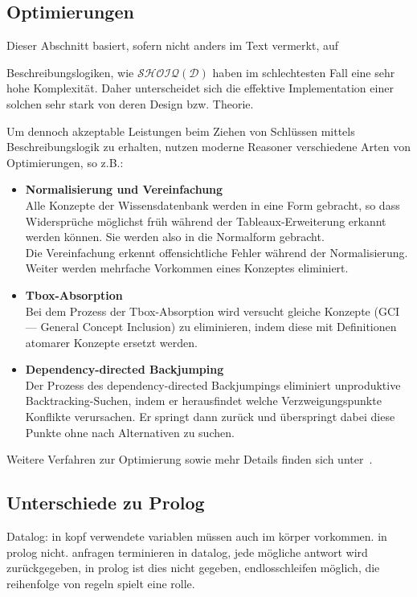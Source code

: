 \subsection{Optimierungen}
\label{subsection:inferenz_pellet_opti}
Dieser Abschnitt basiert, sofern nicht anders im Text vermerkt, auf~\cite[Seiten 16 bis 19]{sirin:pellet05}

Beschreibungslogiken, wie $\mathcal{SHOIQ}(\mathcal{D})$ haben im schlechtesten Fall eine sehr hohe Komplexität. Daher unterscheidet sich die effektive Implementation einer solchen sehr stark von deren Design bzw. Theorie.

Um dennoch akzeptable Leistungen beim Ziehen von Schlüssen mittels Beschreibungslogik zu erhalten, nutzen moderne Reasoner verschiedene Arten von Optimierungen, so z.B.:

\begin{itemize}
    \item \textbf{Normalisierung und Vereinfachung}\\
        Alle Konzepte der Wissensdatenbank werden in eine Form gebracht, so dass Widersprüche möglichst früh während der Tableaux-Erweiterung erkannt werden können. Sie werden also in die Normalform gebracht.\\
        Die Vereinfachung erkennt offensichtliche Fehler während der Normalisierung. Weiter werden mehrfache Vorkommen eines Konzeptes eliminiert.

    \item \textbf{Tbox-Absorption}\\
        Bei dem Prozess der Tbox-Absorption wird versucht gleiche Konzepte (GCI --- General Concept Inclusion) zu eliminieren, indem diese mit Definitionen atomarer Konzepte ersetzt werden.

    \item \textbf{Dependency-directed Backjumping}\\
        Der Prozess des dependency-directed Backjumpings eliminiert unproduktive Backtracking-Suchen, indem er herausfindet welche Verzweigungspunkte Konflikte verursachen. Er springt dann zurück und überspringt dabei diese Punkte ohne nach Alternativen zu suchen.
\end{itemize}

Weitere Verfahren zur Optimierung sowie mehr Details finden sich unter~\cite[S. 17 bis 19]{sirin:pellet05}.


\subsection{Unterschiede zu Prolog}
\label{}
Datalog: in kopf verwendete variablen müssen auch im körper vorkommen. in prolog nicht. anfragen terminieren in datalog, jede mögliche antwort wird zurückgegeben, in prolog ist dies nicht gegeben, endlosschleifen möglich, die reihenfolge von regeln spielt eine rolle.~\cite[Seite 175]{laemmel}

